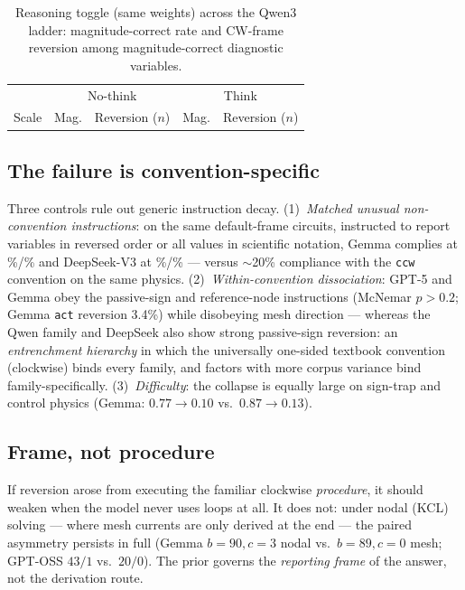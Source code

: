 \documentclass[11pt]{article}
\begin{document}
\begin{table}[t]
\centering\small
\begin{tabular}{lcccc}
\toprule
 & \multicolumn{2}{c}{No-think} & \multicolumn{2}{c}{Think}\\
Scale & Mag. & Reversion ($n$) & Mag. & Reversion ($n$)\\
\midrule

\bottomrule
\end{tabular}
\caption{Reasoning toggle (same weights) across the Qwen3 ladder:
magnitude-correct rate and CW-frame reversion among magnitude-correct
diagnostic variables.}
\label{tab:c1}
\end{table}

\subsection{The failure is convention-specific}
\label{sec:specificity}

Three controls rule out generic instruction decay. (1)~\emph{Matched unusual
non-convention instructions}: on the same default-frame circuits, instructed
to report variables in reversed order or all values in scientific notation,
Gemma complies at \CtlGemmaRev\%/\CtlGemmaSci\% and DeepSeek-V3 at
\CtlDsRev\%/\CtlDsSci\% --- versus $\sim$20\% compliance with the \texttt{ccw}
convention on the same physics. (2)~\emph{Within-convention dissociation}:
GPT-5 and Gemma obey the passive-sign and reference-node instructions
(McNemar $p>0.2$; Gemma \texttt{act} reversion 3.4\%) while disobeying mesh
direction --- whereas the Qwen family and DeepSeek also show strong
passive-sign reversion: an \emph{entrenchment hierarchy} in which the
universally one-sided textbook convention (clockwise) binds every family, and
factors with more corpus variance bind family-specifically.
(3)~\emph{Difficulty}: the collapse is equally large on sign-trap and control
physics (Gemma: $0.77\to0.10$ vs.\ $0.87\to0.13$).

\subsection{Frame, not procedure}
\label{sec:frame}

If reversion arose from executing the familiar clockwise \emph{procedure},
it should weaken when the model never uses loops at all. It does not: under
nodal (KCL) solving --- where mesh currents are only derived at the end ---
the paired asymmetry persists in full (Gemma $b{=}90,c{=}3$ nodal vs.\
$b{=}89,c{=}0$ mesh; GPT-OSS $43/1$ vs.\ $20/0$). The prior governs the
\emph{reporting frame} of the answer, not the derivation route.
\end{document}
